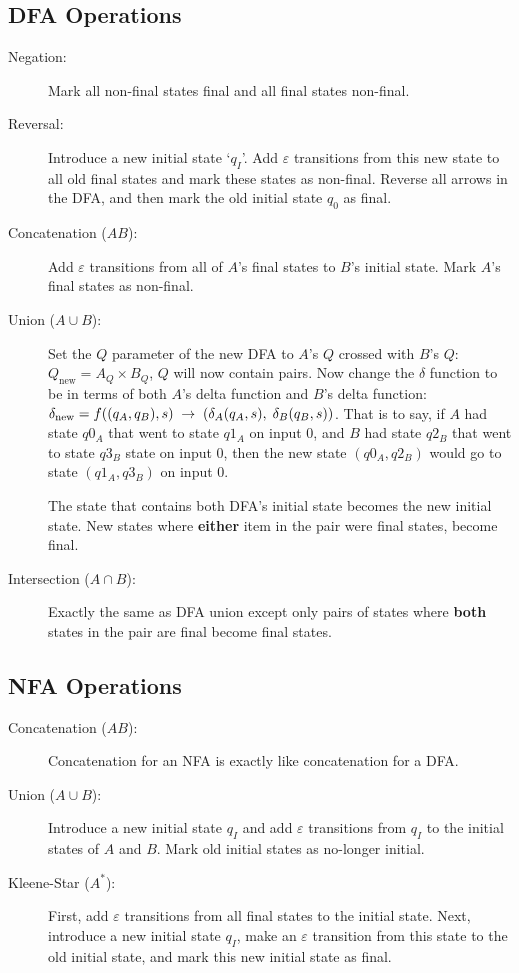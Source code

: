 \subsection{DFA Operations}
\begin{description}
    \item[{\small Negation:}] Mark all non-final states final and all final
    states non-final.

    \item[{\small Reversal:}] Introduce a new initial state `$q_I$'. Add $\varepsilon$
    transitions from this new state to all old final states and mark these states
    as non-final. Reverse all arrows in the DFA, and then mark the old initial
    state $q_0$ as final.

    \item[{\small Concatenation ($AB$):}] Add $\varepsilon$ transitions from
    all of $A$'s final states to $B$'s initial state. Mark $A$'s final states
    as non-final.

    \item[{\small Union ($A \cup B$):}] Set the $Q$ parameter of the new
    DFA to $A$'s $Q$ crossed with $B$'s $Q$: $Q_{\text{new}} = A_Q \times B_Q$, 
    $Q$ will now contain pairs. Now change the $\delta$ function to be in terms 
    of both $A$'s delta function and $B$'s delta function: 
    $\delta_{\text{new}} = f((q_A, q_B), s) \;\to\; (\delta_A(q_A, s),\; \delta_B(q_B, s))$.
    That is to say, if $A$ had state $q0_A$ that went to state $q1_A$ on input 0,
    and $B$ had state $q2_B$ that went to state $q3_B$ state on input 0, then
    the new state $(q0_A, q2_B)$ would go to state $(q1_A, q3_B)$ on input 0.

    The state that contains both DFA's initial state becomes the new initial state.
    New states where \textbf{either} item in the pair were final states, become
    final.
    
    \item[{\small Intersection ($A \cap B$):}] Exactly the same as DFA union
    except only pairs of states where \textbf{both} states in the pair are final
    become final states.
\end{description}

\subsection{NFA Operations}
\begin{description}
    \item[{\small Concatenation ($AB$):}] Concatenation for an NFA is exactly
    like concatenation for a DFA.
    \item[{\small Union ($A \cup B$):}] Introduce a new initial state $q_I$ and
    add $\varepsilon$ transitions from $q_I$ to the initial states of $A$ and
    $B$. Mark old initial states as no-longer initial.
    \item[{\small Kleene-Star ($A^*$):}] First, add $\varepsilon$ transitions from
    all final states to the initial state. Next, introduce a new initial state $q_I$,
    make an $\varepsilon$ transition from this state to the old initial state,
    and mark this new initial state as final. 
\end{description}

